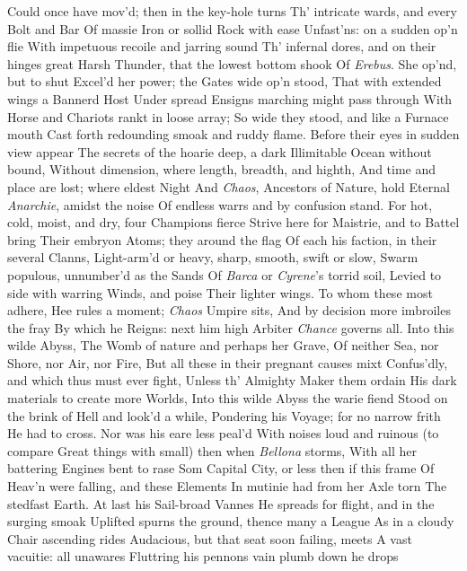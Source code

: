 \documentclass[11pt]{book}
\newcounter {last}
\begin{document}
Could once have mov'd; then in the key-hole turns 
Th' intricate wards, and every Bolt and Bar 
Of massie Iron or sollid Rock with ease 
Unfast'ns: on a sudden op'n flie 
With impetuous recoile and jarring sound 
Th' infernal dores, and on their hinges great 
Harsh Thunder, that the lowest bottom shook 
Of \textit{Erebus}.  She op'nd, but to shut 
Excel'd her power; the Gates wide op'n stood, 
That with extended wings a Bannerd Host 
Under spread Ensigns marching might pass through 
With Horse and Chariots rankt in loose array; 
So wide they stood, and like a Furnace mouth 
Cast forth redounding smoak and ruddy flame. 
Before their eyes in sudden view appear 
The secrets of the hoarie deep, a dark 
Illimitable Ocean without bound, 
Without dimension, where length, breadth, and highth, 
And time and place are lost; where eldest Night 
And \textit{Chaos}, Ancestors of Nature, hold 
Eternal \textit{Anarchie}, amidst the noise 
Of endless warrs and by confusion stand. 
For hot, cold, moist, and dry, four Champions fierce 
Strive here for Maistrie, and to Battel bring 
Their embryon Atoms; they around the flag 
Of each his faction, in their several Clanns, 
Light-arm'd or heavy, sharp, smooth, swift or slow, 
Swarm populous, unnumber'd as the Sands 
Of \textit{Barca} or \textit{Cyrene}'s torrid soil, 
Levied to side with warring Winds, and poise 
Their lighter wings.  To whom these most adhere, 
Hee rules a moment; \textit{Chaos} Umpire sits, 
And by decision more imbroiles the fray 
By which he Reigns: next him high Arbiter 
\textit{Chance} governs all.  Into this wilde Abyss, 
The Womb of nature and perhaps her Grave, 
Of neither Sea, nor Shore, nor Air, nor Fire, 
But all these in their pregnant causes mixt 
Confus'dly, and which thus must ever fight, 
Unless th' Almighty Maker them ordain 
His dark materials to create more Worlds, 
Into this wilde Abyss the warie fiend 
Stood on the brink of Hell and look'd a while, 
Pondering his Voyage; for no narrow frith 
He had to cross.  Nor was his eare less peal'd 
With noises loud and ruinous (to compare 
Great things with small) then when \textit{Bellona} storms, 
With all her battering Engines bent to rase 
Som Capital City, or less then if this frame 
Of Heav'n were falling, and these Elements 
In mutinie had from her Axle torn 
The stedfast Earth.  At last his Sail-broad Vannes 
He spreads for flight, and in the surging smoak 
Uplifted spurns the ground, thence many a League 
As in a cloudy Chair ascending rides 
Audacious, but that seat soon failing, meets 
A vast vacuitie: all unawares 
Fluttring his pennons vain plumb down he drops 
\end{document}
